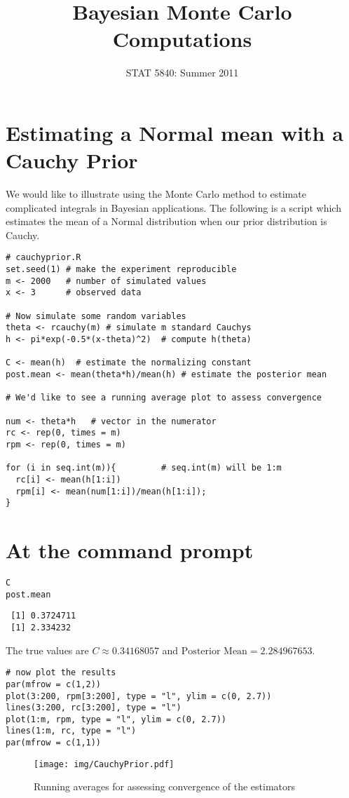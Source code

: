\documentclass[11pt,english]{article}
\title{Bayesian Monte Carlo Computations}
\date{STAT 5840: Summer 2011}
\begin{document}
\maketitle

\thispagestyle{empty}

\section*{Estimating a Normal mean with a Cauchy Prior}
\label{sec-1}

We would like to illustrate using the Monte Carlo method to estimate complicated integrals in Bayesian applications.  The following is a script which estimates the mean of a Normal distribution when our prior distribution is Cauchy.

\begin{verbatim}
# cauchyprior.R
set.seed(1) # make the experiment reproducible
m <- 2000   # number of simulated values
x <- 3      # observed data

# Now simulate some random variables
theta <- rcauchy(m) # simulate m standard Cauchys
h <- pi*exp(-0.5*(x-theta)^2)  # compute h(theta)

C <- mean(h)  # estimate the normalizing constant
post.mean <- mean(theta*h)/mean(h) # estimate the posterior mean

# We'd like to see a running average plot to assess convergence

num <- theta*h   # vector in the numerator
rc <- rep(0, times = m)
rpm <- rep(0, times = m)

for (i in seq.int(m)){         # seq.int(m) will be 1:m
  rc[i] <- mean(h[1:i])
  rpm[i] <- mean(num[1:i])/mean(h[1:i]);
}
\end{verbatim}
\section*{At the command prompt}
\label{sec-2}


\begin{verbatim}
C
post.mean
\end{verbatim}

\begin{verbatim}
 [1] 0.3724711
 [1] 2.334232
\end{verbatim}


The true values are \(C \approx 0.34168057 \) and \(\mbox{Posterior Mean} = 2.284967653\).

\begin{verbatim}
# now plot the results
par(mfrow = c(1,2))
plot(3:200, rpm[3:200], type = "l", ylim = c(0, 2.7))
lines(3:200, rc[3:200], type = "l")
plot(1:m, rpm, type = "l", ylim = c(0, 2.7))
lines(1:m, rc, type = "l")
par(mfrow = c(1,1))
\end{verbatim}

\begin{figure}[h!]
\centering
\texttt{[image: img/CauchyPrior.pdf]}
\caption{\label{fig:yplot}Running averages for assessing convergence of the estimators}
\end{figure}
\end{document}
